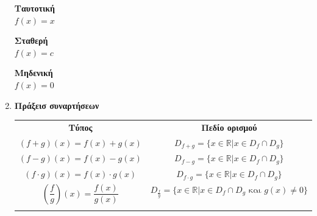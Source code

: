 \documentclass[twoside,nofonts,internet,shmeiwseis]{thewria}
\begin{document}
\begin{enumerate}
\begin{center}
\end{center}
\vspace{-.8cm}
\begin{center}
\begin{minipage}{2.5cm}
\textbf{Ταυτοτική}\\$ f(x)=x $
\end{minipage}\qquad
\begin{minipage}{2.5cm}
\textbf{Σταθερή}\\$ f(x)=c $
\end{minipage}\qquad
\begin{minipage}{2.5cm}
\textbf{Μηδενική}\\$ f(x)=0 $
\end{minipage}
\end{center}
\item \textbf{Πράξεισ συναρτήσεων}
\begin{center}
\begin{longtable}{cc}
\hline \rule[-2ex]{0pt}{5.5ex} \textbf{Τύπος} & \textbf{Πεδίο ορισμού} \\ 
\hhline{==} \rule[-2ex]{0pt}{5.5ex} $ (f+g)(x)=f(x)+g(x) $ & $ D_{f+g}=\{x\in\mathbb{R}|x\in D_f\cap D_g\} $ \\ 
\rule[-2ex]{0pt}{5.5ex} $ (f-g)(x)=f(x)-g(x) $ & $ D_{f-g}=\{x\in\mathbb{R}|x\in D_f\cap D_g\} $ \\ 
\rule[-2ex]{0pt}{5.5ex} $ (f\cdot g)(x)=f(x)\cdot g(x) $ & $ D_{f\cdot g}=\{x\in\mathbb{R}|x\in D_f\cap D_g\} $ \\ 
\rule[-2ex]{0pt}{5.5ex} $ \left(\dfrac{f}{g} \right) (x)=\dfrac{f(x)}{g(x)} $ & $ D_{\frac{f}{g}}=\{x\in\mathbb{R}|x\in D_f\cap D_g\textrm{ και }g(x)\neq0\} $ \\
\rule[0ex]{0pt}{-.5ex} & \\
\hline
\end{longtable}
\end{center}
\end{enumerate}
\newpage
\end{document}
